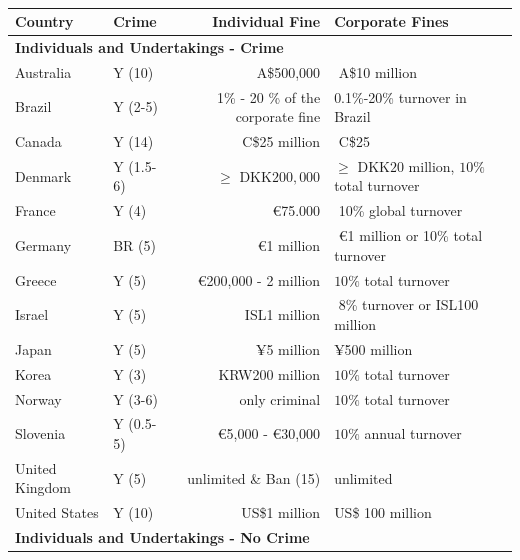 \documentclass[]{article}
\begin{document}
\begin{table}[htp]
\caption{}
\label{table:fines}
\begin{threeparttable}
\begin{tabular}{llrl}
\toprule
Country & Crime\tnote{a} & Individual Fine\tnote{b}&Corporate Fines\tnote{c} \\
	\midrule	
	\multicolumn{4}{l}{\bf{Individuals and Undertakings - Crime}}\\[0.4em]
	Australia  &Y (10)& A\$500,000 &  $ $ A\$10 million\tnote{e}\\
	Brazil  &Y (2-5)& 1\% - 20 \% of the corporate fine &0.1\%-20\% turnover in Brazil\\
	Canada  &Y (14)& C\$25 million &$ $ C\$25 \\
	Denmark &Y (1.5-6)&$\geq$ DKK$200,000$ & $\geq$ DKK$20$ million, $  10\%$ total turnover \\
	France & Y (4)&€75.000 & $ $ 10\% global turnover  \\
	Germany  & BR (5)& $ $ €1 million & $ $ €1 million or 10\% total turnover \\
	Greece  &Y (5)& €200,000 - 2 million &  $  10\%$ total turnover \\
	Israel  &Y (5)& ISL1 million & $ $ 8\% turnover or ISL100 million \\
	Japan  &Y (5) &¥5 million & $ $¥500 million \\
	Korea  & Y (3) &KRW200 million &  $  10\%$ total turnover  \\
	Norway  & Y (3-6)&  only criminal & $  10\%$ total turnover  \\
	Slovenia  &Y (0.5-5)& €5,000 - €30,000 & $10 \%$ annual turnover\\
	United Kingdom & Y (5)  & unlimited \& Ban (15)& unlimited \\
	United States  &Y (10)& US\$1 million & US\$ 100 million \\
\toprule
	\multicolumn{4}{l}{\bf{Individuals and Undertakings - No Crime}}\\[0.4em]


\end{tabular}
\end{threeparttable}
\end{table}
\end{document}
